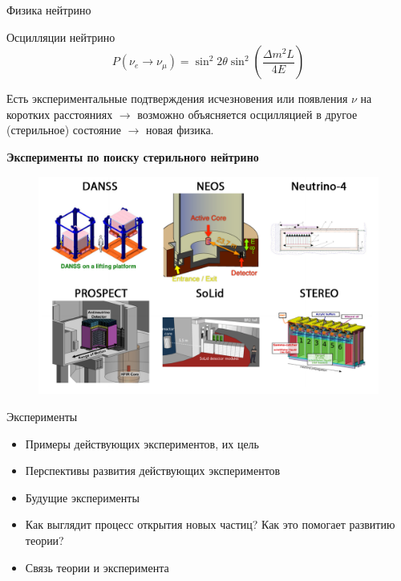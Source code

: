 \documentclass[hyperref={colorlinks,citecolor=blue,linkcolor=blue,urlcolor=blue}]{beamer}
\begin{document}
\begin{frame}{Физика нейтрино}
    \begin{block}{Осцилляции нейтрино}
        \begin{equation}
            P(\nu_e\rightarrow\nu_\mu)=\sin^2{2\theta}\sin^2\left(\frac{\Delta m^2 L}{4E}\right)
        \end{equation}
    \end{block}


    Есть экспериментальные подтверждения исчезновения или появления $\nu$ на коротких расстояниях $\rightarrow$ возможно объясняется осцилляцией в другое (стерильное) состояние $\rightarrow$ новая физика. 

    \textbf{Эксперименты по поиску стерильного нейтрино}
    \begin{figure}[H]
        \centering
        \includegraphics[width=0.5\framewidth]{img/sterile.png}
    \end{figure}
\end{frame}

\begin{frame}{Эксперименты}
    \begin{itemize}
        \item Примеры действующих экспериментов, их цель
        \item Перспективы развития действующих экспериментов
        \item Будущие эксперименты
        \item Как выглядит процесс открытия новых частиц? Как это помогает развитию теории?
        \item Связь теории и эксперимента
    \end{itemize}

\end{frame}
\end{document}
